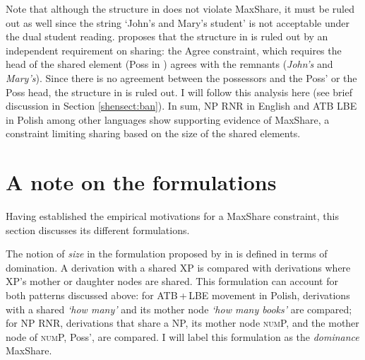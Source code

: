 \documentclass[output=paper]{langscibook}
\begin{document}
Note that although the structure in  does not violate MaxShare, it must be ruled out as well since the string `John's and Mary's student' is not acceptable under the dual student reading. \citet{Shen:2018a} proposes that the structure in  is ruled out by an independent requirement on sharing: the Agree constraint, which requires the head of the shared element (Poss in ) agrees with the remnants (\textit{John's} and \textit{Mary's}). Since there is no agreement between the possessors and the Poss' or the Poss head, the structure in  is ruled out. I will follow this analysis here (see brief discussion in Section \ref{shensect:ban}).
%
%
In sum, NP RNR in English and ATB LBE in Polish among other languages show supporting evidence of MaxShare, a constraint limiting sharing based on the size of the shared elements. 

\section{A note on the formulations}
\label{shensect:formulations}

Having established the empirical motivations for a MaxShare constraint, this section discusses its different formulations. 

The notion of \textit{size} in the formulation proposed by \citet{Shen:2018a} in  is defined in terms of domination. A derivation with a shared XP is compared with derivations where XP's mother or daughter nodes are shared. This formulation can account for both patterns discussed above: for ATB\,+\,LBE movement in Polish, derivations with a shared \textit{`how many'} and its mother node \textit{`how many books'} are compared; for NP RNR, derivations that share a NP, its mother node \textsc{num}P, and the mother node of \textsc{num}P, Poss', are compared. I will label this formulation as the \textit{dominance} MaxShare.
\end{document}
